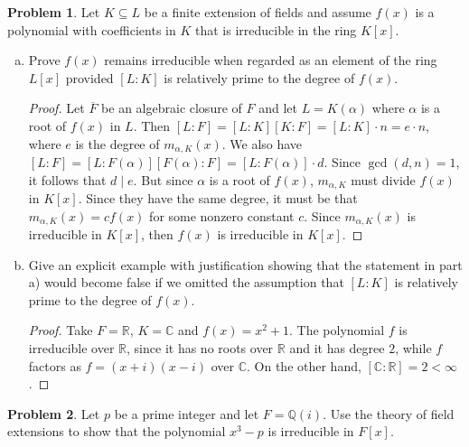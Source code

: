 \documentclass[11pt]{article}
\newcommand{\C}{\mathbb{C}}
\newcommand{\Q}{\mathbb{Q}}
\newcommand{\R}{\mathbb{R}}
\theoremstyle{definition}
\newtheorem{problem}{Problem}
\begin{document}
\begin{problem}
Let $K \subseteq L$ be a finite extension of fields and assume $f(x)$ is a polynomial with coefficients in $K$ that is irreducible in the ring $K[x]$. 

\begin{enumerate}[a)]
\item Prove $f(x)$ remains irreducible when regarded as an element of the ring $L[x]$ provided $[L : K]$ is relatively prime to the degree of $f(x)$.


\begin{proof} 
Let $\overline{F}$ be an algebraic closure of $F$ and let $L = K(\alpha)$ where $\alpha$ is a root of $f(x)$ in $L$. Then $[L: F] = [L: K][K:F] = [L:K] \cdot n = e \cdot n$, where $e$ is the degree of $m_{\alpha, K}(x)$. We also have $[L:F] = [L:F(\alpha)][F(\alpha):F] = [L: F(\alpha)] \cdot d$. Since $\gcd(d,n) = 1$, it follows that $d \mid e$. But since $\alpha$ is a root of $f(x)$, $m_{\alpha, K}$ must divide $f(x)$ in $K[x]$. Since they have the same degree, it must be that $m_{\alpha, K}(x) = cf(x)$ for some nonzero constant $c$. Since $m_{\alpha, K}(x)$ is irreducible in $K[x]$, then $f(x)$ is irreducible in $K[x]$.
\end{proof}




\item Give an explicit example with justification showing that the statement in part a) would become false if we omitted the assumption that $[L : K]$ is relatively prime to the degree of $f(x)$.

\begin{proof} 
Take $F = \R$, $K = \C$ and $f(x) = x^2 + 1$. The polynomial $f$ is irreducible over $\R$, since it has no roots over $\R$ and it has degree $2$, while $f$ factors as $f=(x+i)(x-i)$ over $\C$. On the other hand, $[\C : \R] = 2<\infty$.
\end{proof}
\end{enumerate}
\end{problem}


\begin{problem}
Let $p$ be a prime integer and let $F = \Q(i)$. Use the theory of field extensions to show that the polynomial $x^3 - p$ is irreducible in $F[x]$.
\end{problem}
\end{document}
